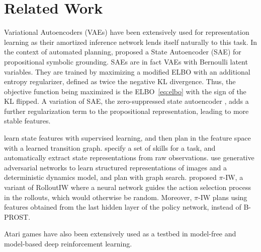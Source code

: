 \section{Related Work}

Variational Autoencoders (VAEs) have been extensively used for representation learning \cite{kingma2019introduction} as their amortized inference network lends itself naturally to this task.
In the context of automated planning, \citet{DBLP:journals/corr/AsaiF17} proposed a State Autoencoder (SAE) for propositional symbolic grounding. SAEs are in fact VAEs with Bernoulli latent variables. They are trained by maximizing a modified ELBO with an additional entropy regularizer, defined as twice the negative KL divergence. Thus, the objective function being maximized is the ELBO~\eqref{eq:elbo} with the sign of the KL flipped. 
%
A variation of SAE, the zero-suppressed state autoencoder \cite{asai2019stable}, adds a further regularization term to the propositional representation, leading to more stable features.

\citet{zhang2018composable} learn state features with supervised learning, and then plan in the feature space with a learned transition graph. 
\citet{konidaris2018skills} specify a set of skills for a task, and automatically extract state representations from raw observations. 
\citet{kurutach2018learning} use generative adversarial networks to learn structured representations of images and a deterministic dynamics model, and plan with graph search.
%
\citet{RLIW} proposed $\pi$-IW, a variant of RolloutIW where a neural network guides the action selection process in the rollouts, which would otherwise be random.
Moreover, $\pi$-IW plans using features obtained from the last hidden layer of the policy network, instead of B-PROST.

Atari games have also been extensively used as a testbed in model-free \citep{dqn, dqn2,a3c,ppo,ga3c,acktr,vtrace, rainbow,kapturowski2018recurrent} and model-based \citep{vpn,dyna_dqn,kaiser2019model,schrittwieser2019mastering,badia2020agent57} deep reinforcement learning. 